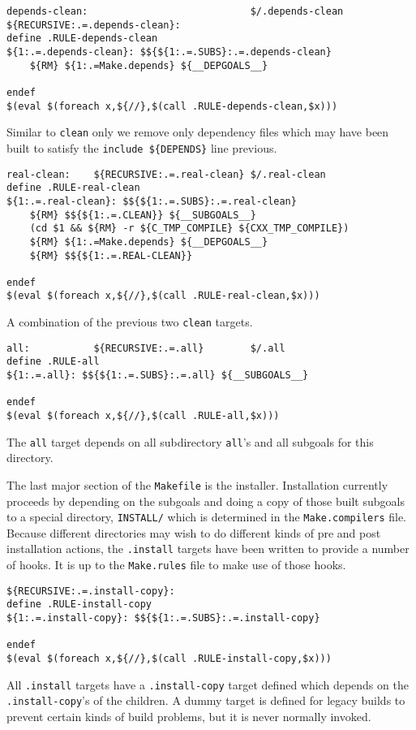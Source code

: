 \documentclass{article}
\begin{document}
\begin{verbatim}
depends-clean:                            $/.depends-clean
${RECURSIVE:.=.depends-clean}:
define .RULE-depends-clean
${1:.=.depends-clean}: $${${1:.=.SUBS}:.=.depends-clean}
	${RM} ${1:.=Make.depends} ${__DEPGOALS__}

endef
$(eval $(foreach x,${//},$(call .RULE-depends-clean,$x)))
\end{verbatim}
Similar to \verb+clean+ only we remove only dependency files which
may have been built to satisfy the \verb+include ${DEPENDS}+ line
previous.

\begin{verbatim}
real-clean:    ${RECURSIVE:.=.real-clean} $/.real-clean
define .RULE-real-clean
${1:.=.real-clean}: $${${1:.=.SUBS}:.=.real-clean}
	${RM} $${${1:.=.CLEAN}} ${__SUBGOALS__}
	(cd $1 && ${RM} -r ${C_TMP_COMPILE} ${CXX_TMP_COMPILE})
	${RM} ${1:.=Make.depends} ${__DEPGOALS__}
	${RM} $${${1:.=.REAL-CLEAN}}

endef
$(eval $(foreach x,${//},$(call .RULE-real-clean,$x)))
\end{verbatim}
A combination of the previous two \verb+clean+ targets.

\begin{verbatim}
all:           ${RECURSIVE:.=.all}        $/.all
define .RULE-all
${1:.=.all}: $${${1:.=.SUBS}:.=.all} ${__SUBGOALS__}

endef
$(eval $(foreach x,${//},$(call .RULE-all,$x)))
\end{verbatim}
The \verb+all+ target depends on all subdirectory \verb+all+'s
and all subgoals for this directory.


The last major section of the \verb+Makefile+ is the installer.
Installation currently proceeds by depending on the subgoals
and doing a copy of those built subgoals to a special directory,
\verb+INSTALL/+ which is determined in the \verb+Make.compilers+
file.  Because different directories may wish to do different
kinds of pre and post installation actions, the \verb+.install+
targets have been written to provide a number of hooks.  It is
up to the \verb+Make.rules+ file to make use of those hooks.

\begin{verbatim}
${RECURSIVE:.=.install-copy}:
define .RULE-install-copy
${1:.=.install-copy}: $${${1:.=.SUBS}:.=.install-copy}

endef
$(eval $(foreach x,${//},$(call .RULE-install-copy,$x)))
\end{verbatim}
All \verb+.install+ targets have a \verb+.install-copy+ target defined
which depends on the \verb+.install-copy+'s of the children.  A dummy
target is defined for legacy builds to prevent certain kinds of
build problems, but it is never normally invoked.
\end{document}
